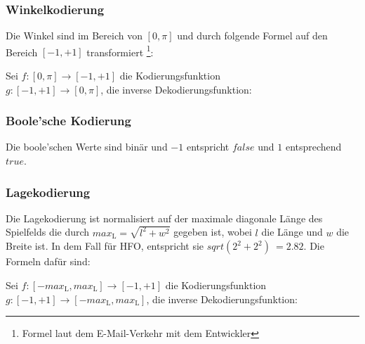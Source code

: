             \subsubsection*{Winkelkodierung}
                Die Winkel sind im Bereich von $[0, \pi]$ und durch folgende Formel auf den Bereich $[-1, +1]$ transformiert \footnote[1]{Formel laut dem E-Mail-Verkehr mit dem Entwickler}:

                \begin{mdframed}
                    Sei $f : [0,\pi] \rightarrow [-1, +1]$ die Kodierungsfunktion \\
                    \hspace*{5mm} $g : [-1, +1] \rightarrow [0, \pi]$, die inverse Dekodierungsfunktion: \\[4mm]
                    \hspace*{10mm} 
                    \hspace*{20mm} 
                \end{mdframed}
                

            \subsubsection*{Boole'sche Kodierung}
                Die boole'schen Werte sind binär und $-1$ entspricht $false$ und $1$ entsprechend $true$.

            \subsubsection*{Lagekodierung}
                Die Lagekodierung ist normalisiert auf der maximale diagonale Länge des Spielfelds die durch $max_{\text{L}} = \sqrt{l^2 + w^2}$ gegeben ist, wobei $l$ die Länge und $w$ die Breite ist. In dem Fall für HFO, entspricht sie $sqrt(2^2 + 2^2) ~= 2.82$. Die Formeln dafür sind: \\

                \begin{mdframed}
                Sei $f : [-max_{\text{L}}, max_{\text{L}}] \rightarrow [-1, +1]$ die Kodierungsfunktion \\
                    \hspace*{5mm} $g : [-1, +1] \rightarrow [-max_{\text{L}}, max_{\text{L}}]$, die inverse Dekodierungsfunktion: \\[4mm]
                    \hspace*{25mm} 
                    \hspace*{20mm} 
                \end{mdframed}

